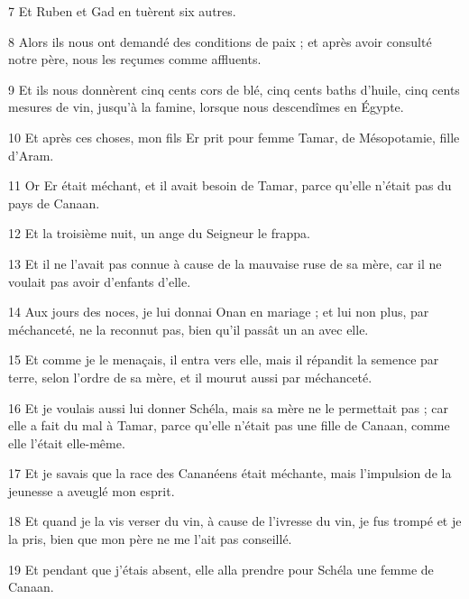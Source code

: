 \par 7 Et Ruben et Gad en tuèrent six autres.

\par 8 Alors ils nous ont demandé des conditions de paix ; et après avoir consulté notre père, nous les reçumes comme affluents.

\par 9 Et ils nous donnèrent cinq cents cors de blé, cinq cents baths d'huile, cinq cents mesures de vin, jusqu'à la famine, lorsque nous descendîmes en Égypte.

\par 10 Et après ces choses, mon fils Er prit pour femme Tamar, de Mésopotamie, fille d'Aram.

\par 11 Or Er était méchant, et il avait besoin de Tamar, parce qu'elle n'était pas du pays de Canaan.

\par 12 Et la troisième nuit, un ange du Seigneur le frappa.

\par 13 Et il ne l'avait pas connue à cause de la mauvaise ruse de sa mère, car il ne voulait pas avoir d'enfants d'elle.

\par 14 Aux jours des noces, je lui donnai Onan en mariage ; et lui non plus, par méchanceté, ne la reconnut pas, bien qu'il passât un an avec elle.

\par 15 Et comme je le menaçais, il entra vers elle, mais il répandit la semence par terre, selon l'ordre de sa mère, et il mourut aussi par méchanceté.

\par 16 Et je voulais aussi lui donner Schéla, mais sa mère ne le permettait pas ; car elle a fait du mal à Tamar, parce qu'elle n'était pas une fille de Canaan, comme elle l'était elle-même.

\par 17 Et je savais que la race des Cananéens était méchante, mais l'impulsion de la jeunesse a aveuglé mon esprit.

\par 18 Et quand je la vis verser du vin, à cause de l'ivresse du vin, je fus trompé et je la pris, bien que mon père ne me l'ait pas conseillé.

\par 19 Et pendant que j'étais absent, elle alla prendre pour Schéla une femme de Canaan.

